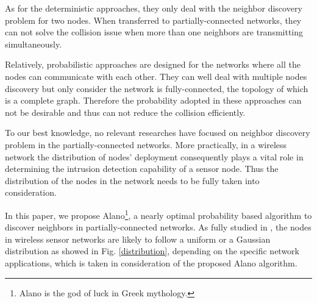 As for the deterministic approaches, they only deal with the neighbor discovery problem for two nodes.
When transferred to partially-connected networks,
they can not solve the collision issue when more than one neighbors are transmitting simultaneously. 

Relatively, probabilistic approaches are designed for the networks where all the nodes can communicate with each other.
They can well deal with multiple nodes discovery but only consider
the network is fully-connected, the topology of which is a complete graph. 
Therefore the probability adopted in these approaches can not be desirable 
and thus can not reduce the collision efficiently.


To our best knowledge, no relevant researches have focused on neighbor discovery problem
in the partially-connected networks. More practically, in a wireless network the distribution of 
nodes' deployment consequently plays a vital role in determining the intrusion detection capability of a sensor node.
Thus the distribution of the nodes in the network needs to be fully taken into 
consideration.

In this paper, we propose Alano\footnote{Alano is the god of luck in Greek mythology.}, 
a nearly optimal probability based algorithm to discover neighbors in partially-connected networks. 
As fully studied in \cite{wang2013gaussian} , the nodes in wireless sensor networks are likely to 
follow a uniform or a Gaussian distribution as showed in Fig. \ref{distribution}, 
depending on the specific network applications, which is taken in consideration of the proposed Alano algorithm.

